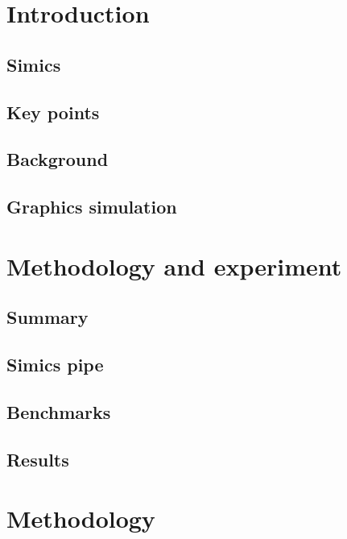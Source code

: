 \documentclass{beamer}
\begin{document}
	

	\section{Introduction}

	\subsection{Simics}
	

	\subsection{Key points}
	

        \subsection{Background}
        

	\subsection{Graphics simulation}
	

        \section{Methodology and experiment}

        \subsection{Summary}
	

	\subsection{Simics pipe}
	

        \subsection{Benchmarks}
	

        \subsection{Results}
        
        
	\section{Methodology}
\end{document}
